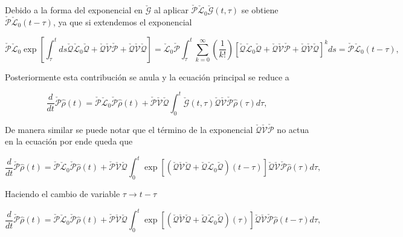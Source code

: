 \begin{appendixs}
Debido a la forma del exponencial en $\check{\mathcal{G}}$ al aplicar $\check{\mathcal{P}}\check{\mathcal{L}}_{0}\check{\mathcal{G}}(t,\tau)$ se obtiene $\check{\mathcal{P}}\check{\mathcal{L}}_{0}(t-\tau)$, ya que si extendemos el exponencial

\begin{equation*}
    \check{\mathcal{P}}\check{\mathcal{L}}_{0}\exp\left[\int_{\tau}^{t}ds\check{\mathcal{Q}}\check{\mathcal{L}}_{0}\check{\mathcal{Q}}+ \check{\mathcal{Q}}\check{\mathcal{V}}\check{\mathcal{P}}+\check{\mathcal{Q}}\check{\mathcal{V}}\check{\mathcal{Q}} \right] = \check{\mathcal{L}}_{0}\check{\mathcal{P}}\int_{\tau}^{t}\sum_{k=0}^{\infty}\left(\frac{1}{k!} \right)\left[\check{\mathcal{Q}}\check{\mathcal{L}}_{0}\check{\mathcal{Q}}+ \check{\mathcal{Q}}\check{\mathcal{V}}\check{\mathcal{P}}+\check{\mathcal{Q}}\check{\mathcal{V}}\check{\mathcal{Q}} \right]^{k}ds = \check{\mathcal{P}}\check{\mathcal{L}}_{0}(t-\tau), 
\end{equation*}

Posteriormente esta contribución se anula y la ecuación principal se reduce a

\begin{equation*}
    \frac{d}{dt}\check{\mathcal{P}}\hat{\rho}(t) = \check{\mathcal{P}}\check{\mathcal{L}}_{0}\check{\mathcal{P}}\hat{\rho}(t) + \check{\mathcal{P}}\check{\mathcal{V}}\check{\mathcal{Q}}\int_{0}^{t}\check{\mathcal{G}}(t,\tau)\check{\mathcal{Q}}\check{\mathcal{V}} \check{\mathcal{P}}\hat{\rho}(\tau)d\tau,        
\end{equation*}

De manera similar se puede notar que el término de la exponencial $\check{\mathcal{Q}}\check{\mathcal{V}}\check{\mathcal{P}}$ no actua en la ecuación por ende queda que 

\begin{equation*}
    \frac{d}{dt}\check{\mathcal{P}}\hat{\rho}(t) = \check{\mathcal{P}}\check{\mathcal{L}}_{0}\check{\mathcal{P}}\hat{\rho}(t) + \check{\mathcal{P}}\check{\mathcal{V}}\check{\mathcal{Q}}\int_{0}^{t}\exp \left[\left(\check{\mathcal{Q}}\check{\mathcal{V}}\check{\mathcal{Q}} + \check{\mathcal{Q}}\check{\mathcal{L}}_{0}\check{\mathcal{Q}}\right) (t-\tau) \right]\check{\mathcal{Q}}\check{\mathcal{V}} \check{\mathcal{P}}\hat{\rho}(\tau)d\tau,        
\end{equation*}

Haciendo el cambio de variable $\tau \to t-\tau$

\begin{equation*}
    \frac{d}{dt}\check{\mathcal{P}}\hat{\rho}(t) = \check{\mathcal{P}}\check{\mathcal{L}}_{0}\check{\mathcal{P}}\hat{\rho}(t) + \check{\mathcal{P}}\check{\mathcal{V}}\check{\mathcal{Q}}\int_{0}^{t}\exp \left[\left(\check{\mathcal{Q}}\check{\mathcal{V}}\check{\mathcal{Q}} + \check{\mathcal{Q}}\check{\mathcal{L}}_{0}\check{\mathcal{Q}}\right) (\tau) \right]\check{\mathcal{Q}}\check{\mathcal{V}} \check{\mathcal{P}}\hat{\rho}(t-\tau)d\tau,        
\end{equation*}


\end{appendixs}
